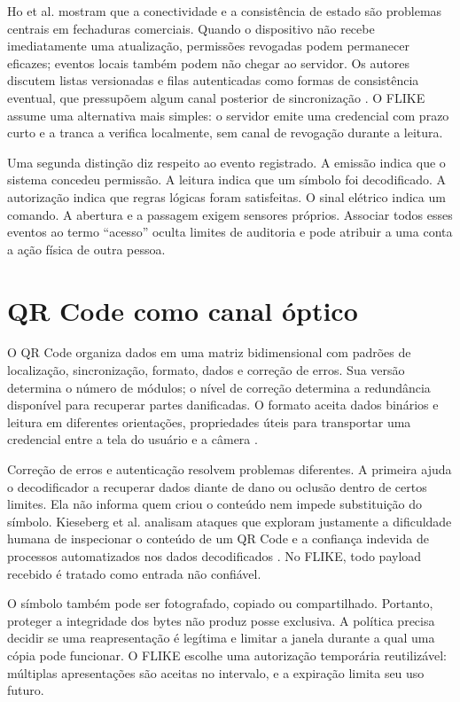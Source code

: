 Ho et al. mostram que a conectividade e a consistência de estado são problemas centrais em fechaduras comerciais. Quando o dispositivo não recebe imediatamente uma atualização, permissões revogadas podem permanecer eficazes; eventos locais também podem não chegar ao servidor. Os autores discutem listas versionadas e filas autenticadas como formas de consistência eventual, que pressupõem algum canal posterior de sincronização \cite{ho2016smartlocks}. O FLIKE assume uma alternativa mais simples: o servidor emite uma credencial com prazo curto e a tranca a verifica localmente, sem canal de revogação durante a leitura.

Uma segunda distinção diz respeito ao evento registrado. A emissão indica que o sistema concedeu permissão. A leitura indica que um símbolo foi decodificado. A autorização indica que regras lógicas foram satisfeitas. O sinal elétrico indica um comando. A abertura e a passagem exigem sensores próprios. Associar todos esses eventos ao termo ``acesso'' oculta limites de auditoria e pode atribuir a uma conta a ação física de outra pessoa.

\section{QR Code como canal óptico}

O QR Code organiza dados em uma matriz bidimensional com padrões de localização, sincronização, formato, dados e correção de erros. Sua versão determina o número de módulos; o nível de correção determina a redundância disponível para recuperar partes danificadas. O formato aceita dados binários e leitura em diferentes orientações, propriedades úteis para transportar uma credencial entre a tela do usuário e a câmera \cite{denso2012qressentials}.

Correção de erros e autenticação resolvem problemas diferentes. A primeira ajuda o decodificador a recuperar dados diante de dano ou oclusão dentro de certos limites. Ela não informa quem criou o conteúdo nem impede substituição do símbolo. Kieseberg et al. analisam ataques que exploram justamente a dificuldade humana de inspecionar o conteúdo de um QR Code e a confiança indevida de processos automatizados nos dados decodificados \cite{kieseberg2010qrcode}. No FLIKE, todo payload recebido é tratado como entrada não confiável.

O símbolo também pode ser fotografado, copiado ou compartilhado. Portanto, proteger a integridade dos bytes não produz posse exclusiva. A política precisa decidir se uma reapresentação é legítima e limitar a janela durante a qual uma cópia pode funcionar. O FLIKE escolhe uma autorização temporária reutilizável: múltiplas apresentações são aceitas no intervalo, e a expiração limita seu uso futuro.

